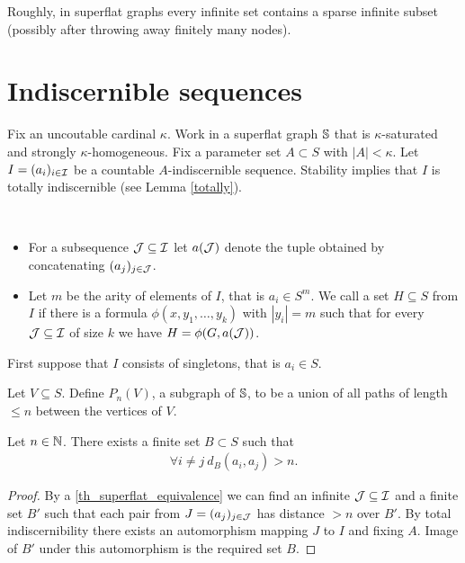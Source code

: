 Roughly, in superflat graphs every infinite set contains a sparse infinite subset (possibly after throwing away finitely many nodes).

\section{Indiscernible sequences}

Fix an uncoutable cardinal $\kappa$.
Work in a superflat graph $\mathbb S$ that is $\kappa$-saturated and strongly $\kappa$-homogeneous.
Fix a parameter set $A \subset S$ with $|A| < \kappa$.
Let $I = (a_i)_{i \in \operatorname{\mathcal I}}$ be a countable $A$-indiscernible sequence.%
Stability implies that $I$ is totally indiscernible (see Lemma \ref{totally}).

\begin{Definition} \ 
  \begin{itemize}
  \item For a subsequence $\operatorname{\mathcal J} \subseteq \operatorname{\mathcal I}$ let $a(\operatorname{\mathcal J})$ denote the tuple obtained by concatenating $(a_j)_{j \in \operatorname{\mathcal J}}$.
  \item Let $m$ be the arity of elements of $I$, that is $a_i \in S^m$.
    We call a set $H \subseteq S$ \defn{uniformly definable} from $I$ if there
    is a formula $\phi(x, y_1, \ldots, y_k)$ with $|y_i| = m$
    such that for every $\operatorname{\mathcal J} \subseteq \operatorname{\mathcal I}$ of size $k$ we have $H = \phi(G, a(\operatorname{\mathcal J}))$.
  \end{itemize}
\end{Definition}

First suppose that $I$ consists of singletons, that is $a_i \in S$.

\begin{Definition}
  Let $V \subseteq S$. Define $P_n(V)$, a subgraph of $\mathbb S$, to be a union of all paths of length $\leq n$ between the vertices of $V$.
\end{Definition}

\begin{Lemma} \label{lm_bump}
  Let $n \in \mathbb{N}$.
  There exists a finite set $B \subset S$ such that
  \begin{align*}
    \forall i \neq j \ d_B(a_i, a_j) > n.
  \end{align*}
\end{Lemma}

\begin{proof}
  By a \ref{th_superflat_equivalence} we can find an infinite $\operatorname{\mathcal J} \subseteq \operatorname{\mathcal I}$ and a finite set $B'$
  such that each pair from $J = (a_j)_{j \in \operatorname{\mathcal J}}$ has distance $>n$ over $B'$.
  By total indiscernibility there exists an automorphism mapping $J$ to $I$ and fixing $A$.
  Image of $B'$ under this automorphism is the required set $B$.
\end{proof}

